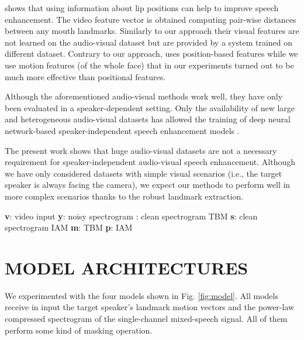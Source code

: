 \documentclass{article}
\begin{document}
\cite{hou_audio-visual_2016} shows that using information about lip positions can help to improve speech enhancement. The video feature vector is obtained computing pair-wise distances between any mouth landmarks. 
Similarly to our approach their visual features are not learned on the audio-visual dataset but are provided by a system trained on different dataset. Contrary to our approach, \cite{hou_audio-visual_2016} uses position-based features while we use motion features (of the whole face) that in our experiments turned out to be much more effective than positional features.  

Although the aforementioned audio-visual methods work well, they have only been evaluated in a speaker-dependent setting.
Only the availability of new large and heterogeneous audio-visual datasets has allowed the training of deep neural network-based speaker-independent  speech enhancement models \cite{ephrat_looking_2018, afouras_conversation:_2018, owens2018audio}. 

The present work shows that huge audio-visual datasets are not a necessary requirement for speaker-independent audio-visual speech enhancement. Although we have only considered datasets with simple visual scenarios (i.e., the target speaker is always facing the camera), we expect our methods to perform well in more complex scenarios thanks to the robust landmark extraction.
  
\begin{figure*}[t]
  \centering
  \footnotesize{\quad \textbf{v}: video input \qquad \textbf{y}: noisy spectrogram \qquad: clean spectrogram TBM \qquad\textbf{s}: clean spectrogram IAM \qquad \textbf{m}: TBM \qquad \textbf{p}: IAM}
  
  \caption{Model architectures.}
  \label{fig:model}
\end{figure*}

\section{MODEL ARCHITECTURES}
\label{sec:model}
We experimented with the four models shown in Fig. \ref{fig:model}.
All models receive in input the target speaker's landmark motion vectors and the power-law compressed spectrogram of the single-channel mixed-speech signal. All of them perform some kind of masking operation.
\end{document}
